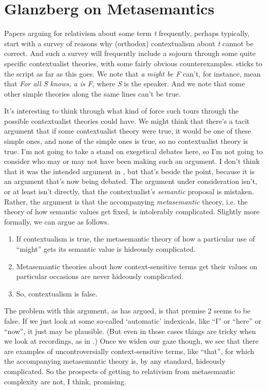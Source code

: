 \section{Glanzberg on Metasemantics}

Papers arguing for relativism about some term \textit{t} frequently, perhaps typically, start with a survey of reasons why (orthodox) contextualism about \textit{t} cannot be correct. And such a survey will frequently include a sojourn through some quite specific contextualist theories, with some fairly obvious counterexamples.  \citet{Egan2005-EGAEMI} sticks to the script as far as this goes. We note that \textit{a }\textit{might be F} can't, for instance, mean that \textit{For all S knows, a is F}, where \textit{S} is the speaker. And we note that some other simple theories along the same lines can't be true.

It's interesting to think through what kind of force such tours through the possible contextualist theories could have. We might think that there's a tacit argument that if some contextualist theory were true, it would be one of these simple ones, and none of the simple ones is true, so no contextualist theory is true. I'm not going to take a stand on exegetical debates here, so I'm not going to consider who may or may not have been making such an argument. I don't think that it was the intended argument in \citet{Egan2005-EGAEMI}, but that's beside the point, because it is an argument that's now being debated. The argument under consideration isn't, or at least isn't directly, that the contextualist's \textit{semantic} proposal is mistaken. Rather, the argument is that the accompanying \textit{metasemantic} theory, i.e. the theory of how semantic values get fixed, is intolerably complicated. Slightly more formally, we can argue as follows.

\renewcommand{\labelenumi}{\arabic{enumi}.}
\begin{enumerate}
\item If contextualism is true, the metasemantic theory of how a particular use of ``might'' gets its semantic value is hideously complicated.
\item Metasemantic theories about how context-sensitive terms get their values on particular occasions are never hideously complicated.
\item So, contextualism is false.
\end{enumerate}

\noindent The problem with this argument, as \citet{Glanzberg2007} has argued, is that premise 2 seems to be false. If we just look at some so-called `automatic' indexicals, like ``I'' or ``here'' or ``now'', it just may be plausible. (But even in those cases things are tricky when we look at recordings, as in \citet{Weatherson2002-WEAMI}.) Once we widen our gaze though, we see that there are examples of uncontroversially context-sensitive terms, like ``that'', for which the accompanying metasemantic theory is, by any standard, hideously complicated. So the prospects of getting to relativism from metasemantic complexity are not, I think, promising.

